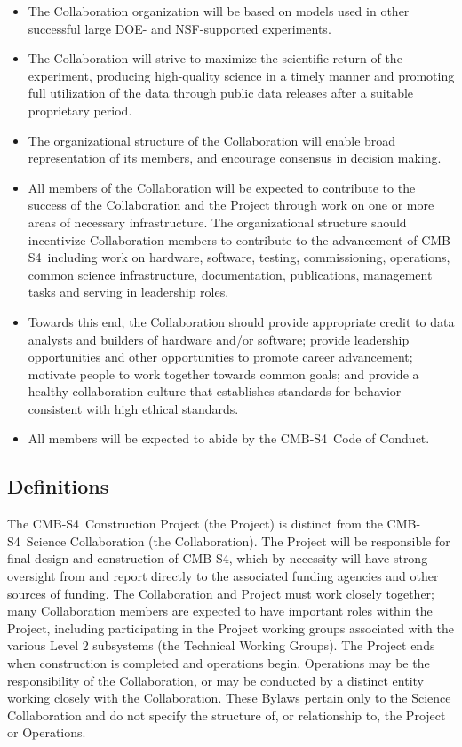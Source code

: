 \documentclass[12pt]{article}
\newcommand\collabname{CMB-S4}
\begin{document}
\begin{itemize}
\item The Collaboration organization will be based on models used in other successful  large DOE- and NSF-supported experiments. 

\item The Collaboration will strive to maximize the scientific return of the experiment, producing high-quality science in a timely manner and promoting full utilization of the data through public data releases after a suitable proprietary period.

\item The organizational structure of the Collaboration will enable broad representation of its members, and encourage consensus in decision making. 

\item All members of the Collaboration will be expected to contribute to the success of the Collaboration and the Project through work on one or more areas of necessary infrastructure. The organizational structure should incentivize Collaboration members to contribute to the advancement of \collabname\  including work on hardware, software, testing, commissioning, operations, common science infrastructure, documentation,  publications,  management tasks and serving in leadership roles.

\item Towards this end, the Collaboration should provide appropriate credit to data analysts and builders of hardware and/or software; provide leadership opportunities and other opportunities to promote career advancement; motivate people to work together towards common goals; and provide a healthy collaboration culture that establishes standards for behavior consistent with high ethical standards.

\item All members will be expected to abide by the \collabname\ Code of Conduct. 

\end{itemize}

\subsection{Definitions}

The \collabname\ Construction Project (the Project) is distinct from the \collabname\ Science Collaboration (the Collaboration). The Project will be responsible for final design and construction of \collabname, which by necessity will have strong oversight from and  report directly to the associated funding agencies and other sources of funding. The Collaboration and Project must work closely together; many Collaboration members are expected to have important roles within the Project, including participating in the Project working groups associated with the various Level 2 subsystems (the Technical Working Groups). The Project ends when construction is completed and operations begin. Operations may be the responsibility of the Collaboration, or may be conducted by a distinct entity working closely with the Collaboration. These Bylaws pertain only to the Science Collaboration and do not specify the structure of, or relationship to, the Project or Operations. 
\end{document}
